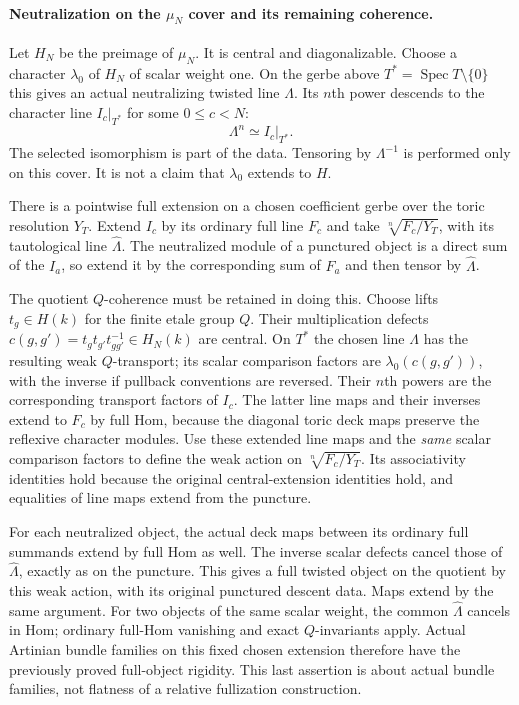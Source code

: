 \paragraph{Neutralization on the $\mu_N$ cover and its remaining coherence.}
Let $H_N$ be the preimage of $\mu_N$.  It is central and
diagonalizable.  Choose a character $\lambda_0$ of $H_N$ of
scalar weight one.  On the gerbe above
$T^*=\operatorname{Spec}T\setminus\{0\}$ this gives an actual
neutralizing twisted line $\Lambda$.  Its $n$th power descends
to the character line $I_c|_{T^*}$ for some $0\le c<N$:
\[
                      \Lambda^n\simeq I_c|_{T^*}.     \tag{C.TP.11}
\]
The selected isomorphism is part of the data.  Tensoring by
$\Lambda^{-1}$ is performed only on this cover.  It is not a
claim that $\lambda_0$ extends to $H$.

There is a pointwise full extension on a chosen coefficient gerbe
over the toric resolution $Y_T$.  Extend $I_c$ by its ordinary
full line $F_c$ and take $\sqrt[n]{F_c/Y_T}$, with its tautological
line $\widehat\Lambda$.  The neutralized module of a punctured
object is a direct sum of the $I_a$, so extend it by the corresponding
sum of $F_a$ and then tensor by $\widehat\Lambda$.

The quotient $Q$-coherence must be retained in doing this.
Choose lifts $t_g\in H(k)$ for the finite etale group $Q$.
Their multiplication defects
$c(g,g')=t_gt_{g'}t_{gg'}^{-1}\in H_N(k)$ are central.
On $T^*$ the chosen line $\Lambda$ has the resulting weak
$Q$-transport; its scalar comparison factors are
$\lambda_0(c(g,g'))$, with the inverse if pullback conventions
are reversed.  Their $n$th powers are the corresponding transport
factors of $I_c$.  The latter line maps and their inverses extend
to $F_c$ by full Hom, because the diagonal toric deck maps preserve
the reflexive character modules.  Use these extended line maps
and the \emph{same} scalar comparison factors to define the weak
action on $\sqrt[n]{F_c/Y_T}$.  Its associativity identities hold
because the original central-extension identities hold, and equalities
of line maps extend from the puncture.

For each neutralized object, the actual deck maps between its
ordinary full summands extend by full Hom as well.  The inverse
scalar defects cancel those of $\widehat\Lambda$, exactly as
on the puncture.  This gives a full twisted object on the quotient
by this weak action, with its original punctured descent data.
Maps extend by the same argument.  For two objects of the same
scalar weight, the common $\widehat\Lambda$ cancels in Hom;
ordinary full-Hom vanishing and exact $Q$-invariants apply.
Actual Artinian bundle families on this fixed chosen extension
therefore have the previously proved full-object rigidity.  This
last assertion is about actual bundle families, not flatness of a
relative fullization construction.

